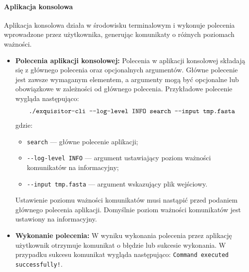             \paragraph{Aplikacja konsolowa}
                
                Aplikacja konsolowa działa w środowisku terminalowym i wykonuje polecenia wprowadzone przez użytkownika, generując komunikaty o różnych poziomach ważności.
                
                \begin{itemize}
                
                    \item{
                        \textbf{Polecenia aplikacji konsolowej:}
                        Polecenia w aplikacji konsolowej składają się z głównego polecenia oraz opcjonalnych argumentów. Główne polecenie jest zawsze wymaganym elementem, a argumenty mogą być opcjonalne lub obowiązkowe w zależności od głównego polecenia.
                        Przykładowe polecenie wygląda następująco:
                        \[
                            \texttt{./exquisitor-cli -\phantom{}-log-level INFO search -\phantom{}-input tmp.fasta}
                        \]
                        gdzie:
                        \begin{itemize}
                            \item {
                                \texttt{search} — główne polecenie aplikacji;
                            }
                            \item {
                                \texttt{-\phantom{}-log-level INFO} — argument ustawiający poziom ważności komunikatów na informacyjny;
                            }
                            \item {
                                \texttt{-\phantom{}-input tmp.fasta} — argument wskazujący plik wejściowy.
                            }
                        \end{itemize}
                        Ustawienie poziomu ważności komunikatów musi nastąpić przed podaniem głównego polecenia aplikacji. Domyślnie poziom ważności komunikatów jest ustawiony na informacyjny.
                    }
                    \item {
                        \textbf{Wykonanie polecenia:}
                        W wyniku wykonania polecenia przez aplikację użytkownik otrzymuje komunikat o błędzie lub sukcesie wykonania. W przypadku sukcesu komunikat wygląda następująco:
                        \texttt{Command executed successfully!}.
}
\end{itemize}
